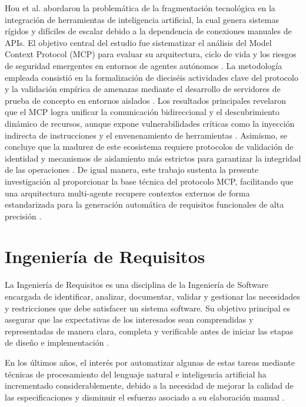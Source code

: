 Hou et al. \cite{hou2025model} abordaron la problemática de la fragmentación tecnológica en la integración de herramientas de inteligencia artificial, la cual 
genera sistemas rígidos y difíciles de escalar debido a la dependencia de conexiones manuales de APIs. El objetivo central del estudio fue sistematizar 
el análisis del Model Context Protocol (MCP) para evaluar su arquitectura, ciclo de vida y los riesgos de seguridad emergentes en entornos de agentes 
autónomos \cite{hou2025model}. La metodología empleada consistió en la formalización de dieciséis actividades clave del protocolo y la validación empírica 
de amenazas mediante el desarrollo de servidores de prueba de concepto en entornos aislados \cite{hou2025model}. Los resultados principales revelaron que el 
MCP logra unificar la comunicación bidireccional y el descubrimiento dinámico de recursos, aunque expone vulnerabilidades críticas como la inyección 
indirecta de instrucciones y el envenenamiento de herramientas \cite{hou2025model}. Asimismo, se concluye que la madurez de este ecosistema requiere protocolos 
de validación de identidad y mecanismos de aislamiento más estrictos para garantizar la integridad de las operaciones \cite{hou2025model}. De igual manera, 
este trabajo sustenta la presente investigación al proporcionar la base técnica del protocolo MCP, facilitando que una arquitectura multi-agente recupere 
contextos externos de forma estandarizada para la generación automática de requisitos funcionales de alta precisión \cite{hou2025model}.



\section{Ingeniería de Requisitos }
La Ingeniería de Requisitos es una disciplina de la Ingeniería de Software encargada de identificar, analizar, 
documentar, validar y gestionar las necesidades y restricciones que debe satisfacer un sistema software. Su objetivo principal es asegurar
que las expectativas de los interesados sean comprendidas y representadas de manera clara, completa y verificable antes de iniciar 
las etapas de diseño e implementación \cite{Wolf2026}.

En los últimos años, el interés por automatizar algunas de estas tareas mediante técnicas de procesamiento del lenguaje natural e inteligencia
artificial ha incrementado considerablemente, debido a la necesidad de mejorar la calidad de las especificaciones y disminuir el esfuerzo asociado 
a su elaboración manual \cite{cheng2026generative}.

